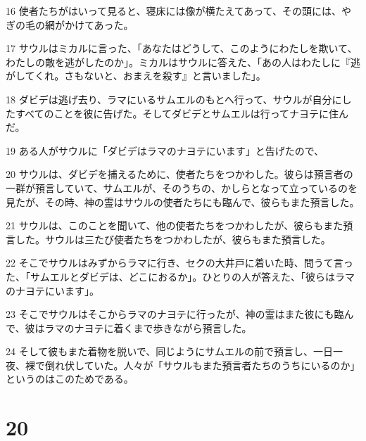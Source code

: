 \par 16 使者たちがはいって見ると、寝床には像が横たえてあって、その頭には、やぎの毛の網がかけてあった。
\par 17 サウルはミカルに言った、「あなたはどうして、このようにわたしを欺いて、わたしの敵を逃がしたのか」。ミカルはサウルに答えた、「あの人はわたしに『逃がしてくれ。さもないと、おまえを殺す』と言いました」。
\par 18 ダビデは逃げ去り、ラマにいるサムエルのもとへ行って、サウルが自分にしたすべてのことを彼に告げた。そしてダビデとサムエルは行ってナヨテに住んだ。
\par 19 ある人がサウルに「ダビデはラマのナヨテにいます」と告げたので、
\par 20 サウルは、ダビデを捕えるために、使者たちをつかわした。彼らは預言者の一群が預言していて、サムエルが、そのうちの、かしらとなって立っているのを見たが、その時、神の霊はサウルの使者たちにも臨んで、彼らもまた預言した。
\par 21 サウルは、このことを聞いて、他の使者たちをつかわしたが、彼らもまた預言した。サウルは三たび使者たちをつかわしたが、彼らもまた預言した。
\par 22 そこでサウルはみずからラマに行き、セクの大井戸に着いた時、問うて言った、「サムエルとダビデは、どこにおるか」。ひとりの人が答えた、「彼らはラマのナヨテにいます」。
\par 23 そこでサウルはそこからラマのナヨテに行ったが、神の霊はまた彼にも臨んで、彼はラマのナヨテに着くまで歩きながら預言した。
\par 24 そして彼もまた着物を脱いで、同じようにサムエルの前で預言し、一日一夜、裸で倒れ伏していた。人々が「サウルもまた預言者たちのうちにいるのか」というのはこのためである。

\chapter{20}

